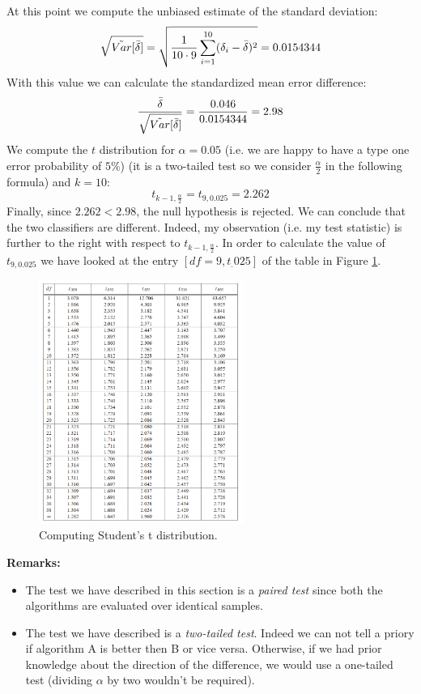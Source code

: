 At this point we compute the unbiased estimate of the standard deviation:
\[
	\sqrt{\tilde{Var}[\Bar{\delta}]}= \sqrt{\frac{1}{10 \cdot 9}\sum_{i=1}^{10}(\delta_{i}-
	\Bar{\delta})^{2}}= 0.0154344
\]
With this value we can calculate the standardized mean error difference:
\[
	\frac{\Bar{\delta}}{\sqrt{\tilde{Var}[\Bar{\delta}]}}= \frac{0.046}{0.0154344}=
	2.98
\]
We compute the $t$ distribution for $\alpha=0.05$ (i.e. we are happy to have a type
one error probability of $5\%$) (it is a two-tailed test so we consider $\frac{\alpha}{2}$
in the following formula) and $k=10$:
\[
	t_{k-1, \frac{\alpha}{2}}= t_{9,0.025}= 2.262
\]
Finally, since $2.262 < 2.98$, the null hypothesis is rejected. We can conclude
that the two classifiers are different. Indeed, my observation (i.e. my test
statistic) is further to the right with respect to $t_{k-1, \frac{\alpha}{2}}$.
In order to calculate the value of $t_{9,0.025}$ we have looked at the entry
$[d f = 9, t_{.}025]$ of the table in Figure \ref{fig:tDistributionTable}.
\newline

\begin{figure}[H]
	\centering
	\includegraphics[width=0.6\textwidth]{
        images/06_Evaluation_tDistribution.png
    }
	\caption{Computing Student's t distribution.}
	\label{fig:tDistributionTable}
\end{figure}

\textbf{Remarks:}
\begin{itemize}
	\item The test we have described in this section is a \textit{paired test}
		since both the algorithms are evaluated over identical samples.

	\item The test we have described is a \textit{two-tailed test}. Indeed we can not
		tell a priory if algorithm A is better then B or vice versa. Otherwise, if we
		had prior knowledge about the direction of the difference, we would use a
		one-tailed test (dividing $\alpha$ by two wouldn't be required).
\end{itemize}